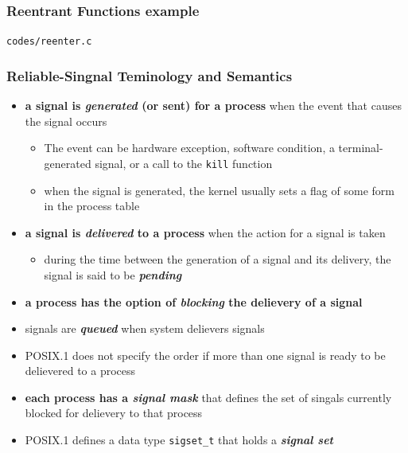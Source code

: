 \documentclass[newPxFont,sthlmFooter,nooffset]{beamer}
\begin{document}
\begin{frame}
  \frametitle{Reentrant Functions example}
\texttt{codes/reenter.c}

\end{frame}

\begin{frame}[fragile,t]
  \frametitle{Reliable-Singnal Teminology and Semantics}

\begin{itemize}
\item  \textbf{a signal is \textit{generated} (or sent) for a process } when the event that causes the signal occurs
  \begin{itemize}
  \item  \footnotesize The event can be hardware exception, software condition, a terminal-generated signal, or a call to the \texttt{kill} function
  \item  \footnotesize when the signal is generated, the kernel usually sets a flag of some form in the process table
  \end{itemize}
\item <2-> \textbf{a signal is \textit{delivered} to a process} when the action for a signal is taken
  \begin{itemize}
  \item <2-> \footnotesize during the time between the generation of a signal and its delivery, the signal is said to be \textbf{\textit{pending}}
  \end{itemize}
\item <3-> \textbf{a process has the option of \textit{blocking} the delievery of a signal}
\item <4-> signals are \textbf{\textit{queued}} when system delievers signals
\item <5-> POSIX.1 does not specify the order if more than one signal is ready to be delievered to a process
\item <6-> \textbf{each process has a \textit{signal mask}} that defines the set of singals currently blocked for delievery to that process
\item <7-> POSIX.1 defines a data type \texttt{sigset\_t} that holds a \textbf{\textit{signal set}}

\end{itemize}


\end{frame}
\end{document}
